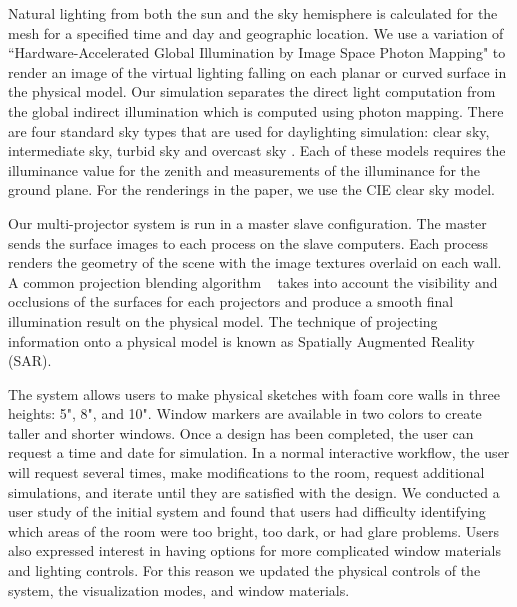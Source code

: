\documentclass[10pt,twocolumn,letterpaper]{article}
\begin{document}
Natural lighting from both the sun and the sky hemisphere is
calculated for the mesh for a specified time and day and geographic
location.  We use a variation of 
%
``Hardware-Accelerated Global Illumination by Image Space Photon Mapping"
%
%
\cite{mcguire09imagespace} to render an image of the virtual lighting
falling on each planar or curved surface in the physical model.
%
%
Our simulation separates the direct light computation from the global
indirect illumination which is computed using photon mapping.  There
are four standard sky types that are used for daylighting simulation:
clear sky, intermediate sky, turbid sky and overcast sky
\cite{international1994spatial,perez1990modeling}.  Each of these
models requires the illuminance value for the zenith
\cite{Karayel1984283} and measurements of the illuminance for the
ground plane.  For the renderings in the paper, we use the CIE clear
sky model.

Our multi-projector system is run in a master slave configuration.
The master sends the surface images to each process on the slave
computers.  Each process renders the geometry of the scene with the
image textures overlaid on each wall.  A common projection blending
algorithm 
%
~\cite{Raskar:2001:SLA}
takes into account
%
the visibility and occlusions of the surfaces for each projectors and
produce a smooth final illumination result on the physical model.
The technique of projecting information onto a physical model is known as
Spatially Augmented Reality (SAR).

The system allows users to make physical sketches with foam core walls
in three heights: 5", 8", and 10".  Window markers are available in
two colors to create taller and shorter windows.  Once a design has
been completed, the user can request a time and date for simulation.
In a normal interactive workflow, the user will request several times,
make modifications to the room, request additional simulations, and
iterate until they are satisfied with the design.  We conducted a user
study of the initial system and found that users had difficulty
identifying which areas of the room were too bright, too dark, or had
glare problems.  Users also expressed interest in having options for
more complicated window materials and lighting controls.  For this
reason we updated the physical controls of the system, the
visualization modes, and window materials.
\end{document}
